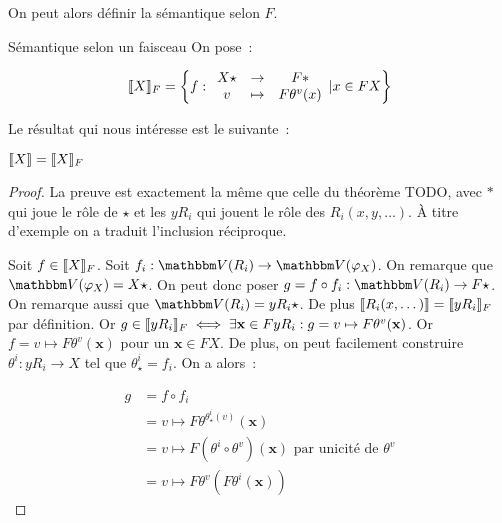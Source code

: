 On peut alors définir la sémantique selon $F$.

\begin{defi}{Sémantique selon un faisceau}
    On pose~:

    \[\llbracket {X} \rrbracket_F = \left\{f:\begin{array}{ccc}
        X\star & \rightarrow & F\ast \\
        v      & \mapsto     & F\theta^v(x)
    \end{array} | x\in F X\right\}\]
\end{defi}

Le résultat qui nous intéresse est le suivante~:

\begin{prop}
    $\llbracket {X} \rrbracket = \llbracket {X} \rrbracket_F$
\end{prop}

\begin{proof}
    La preuve est exactement la même que celle du théorème TODO, avec $\ast$ qui joue
    le rôle de $\star$ et les $yR_i$ qui jouent le rôle des $R_i(x, y, \dots)$. À
    titre d'exemple on a traduit l'inclusion réciproque.

    \boxed{\supseteq} Soit $f\in\llbracket {X} \rrbracket_F$. Soit $f_i : \V(R_i)\rightarrow\V(\phi_X)$.
    On remarque que $\V(\phi_X) = X\star$. On peut donc poser
    $g = f\circ f_i : \V(R_i)\rightarrow F\star$. On remarque aussi que
    $\V(R_i) = yR_i\star$. De plus $\llbracket {R_i(x, \dots)} \rrbracket = \llbracket {yR_i} \rrbracket_F$ par définition.
    Or $g\in\llbracket {yR_i} \rrbracket_F\iff
    \exists \mathbf{x}\in F y R_i: g = v\mapsto F\theta^v(\mathbf{x})$. Or
    $f = v\mapsto F\theta^v(\mathbf{x})$ pour un $\mathbf{x}\in F X$. De plus,
    on peut facilement construire $\theta^i : yR_i\rightarrow X$ tel que
    $\theta^i_\star = f_i$. On a alors~:

    \begin{align*}
        g &= f\circ f_i \\
          &= v\mapsto F\theta^{\theta^i_\star(v)}(\mathbf{x}) \\
          &= v\mapsto F(\theta^i\circ\theta^v)(\mathbf{x})\text{ par unicité de $\theta^v$} \\
          &= v\mapsto F\theta^v(F\theta^i(\mathbf{x}))
    \end{align*}
\end{proof}


